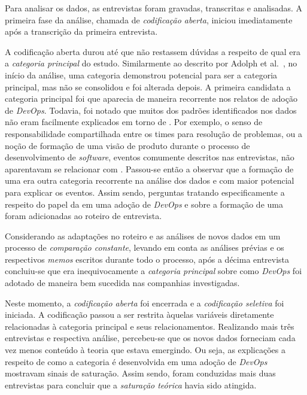 Para analisar os dados, as entrevistas foram gravadas, transcritas e analisadas.
A primeira fase da análise, chamada de \emph{codificação aberta}, iniciou
imediatamente após a transcrição da primeira entrevista.

A codificação aberta durou até que não restassem dúvidas a respeito de qual era
a \emph{categoria principal} do estudo. Similarmente ao descrito por Adolph et
al.~\cite{reconciling_perspectives}, no início da análise, uma categoria
demonstrou potencial para ser a categoria principal, mas não se consolidou e foi
alterada depois. A primeira candidata a categoria principal foi 
que aparecia de maneira recorrente nos relatos de adoção de {\it DevOps}.
Todavia, foi notado que muitos dos padrões identificados nos dados não eram
facilmente explicados em torno de . Por exemplo, o senso de
responsabilidade compartilhada entre os times para resolução de problemas, ou
a noção de formação de uma visão de produto durante o processo de desenvolvimento
de {\it software}, eventos comumente descritos nas entrevistas, não aparentavam
se relacionar com . Passou-se então a observar que a formação de
uma \cc era outra categoria recorrente na análise dos dados e com maior
potencial para explicar os eventos. Assim sendo, perguntas tratando
especificamente a respeito do papel da  em uma adoção de {\it DevOps}
e sobre a formação de uma \cc foram adicionadas ao roteiro de entrevista.

Considerando as adaptações no roteiro e as análises de novos dados em um
processo de \emph{comparação constante}, levando em conta as análises prévias e
os respectivos {\it memos} escritos durante todo o processo, após a décima
entrevista concluiu-se que \cc era inequivocamente a \emph{categoria principal}
sobre como {\it DevOps} foi adotado de maneira bem sucedida nas companhias
investigadas.

Neste momento, a \emph{codificação aberta} foi encerrada e a \emph{codificação
seletiva} foi iniciada. A codificação passou a ser restrita àquelas variáveis
diretamente relacionadas à categoria principal e seus relacionamentos. Realizando
mais três entrevistas e respectiva análise, percebeu-se que os novos dados
forneciam cada vez menos conteúdo à teoria que estava emergindo. Ou seja, as
explicações a respeito de como a categoria \cc é desenvolvida em uma adoção de
{\it DevOps} mostravam sinais de saturação. Assim sendo, foram conduzidas mais
duas entrevistas para concluir que a \emph{saturação teórica} havia sido atingida.

